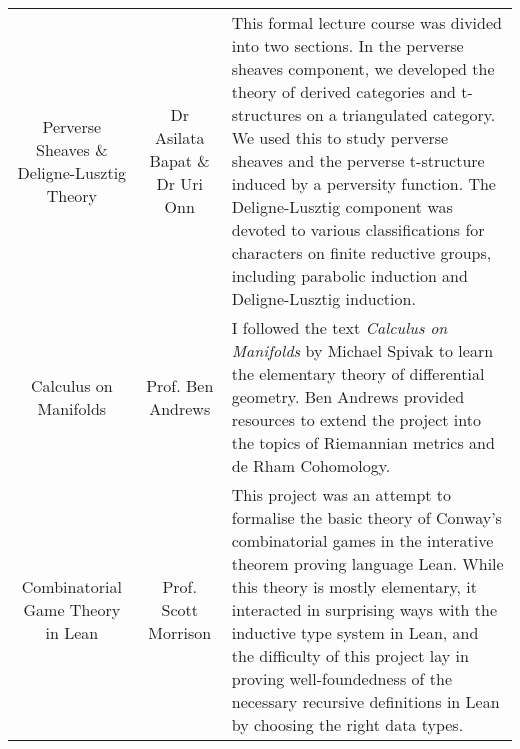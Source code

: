 \documentclass[a4paper,10pt]{article} %
\begin{document}
\begin{tabulary}{\textwidth}{ C  C  L }
Perverse Sheaves \& Deligne-Lusztig Theory & Dr Asilata Bapat \& Dr Uri Onn & \footnotesize This formal lecture course was divided into two sections. In the perverse sheaves component, we developed the theory of derived categories and t-structures on a triangulated category. We used this to study perverse sheaves and the perverse t-structure induced by a perversity function. The Deligne-Lusztig component was devoted to various classifications for characters on finite reductive groups, including parabolic induction and Deligne-Lusztig induction. \normalsize\\

Calculus on Manifolds & Prof. Ben Andrews & \footnotesize I followed the text \emph{Calculus on Manifolds} by Michael Spivak to learn the elementary theory of differential geometry. Ben Andrews provided resources to extend the project into the topics of Riemannian metrics and de Rham Cohomology.\normalsize\\

Combinatorial Game Theory in Lean & Prof. Scott Morrison & \footnotesize This project was an attempt to formalise the basic theory of Conway's combinatorial games in the interative theorem proving language Lean. While this theory is mostly elementary, it interacted in surprising ways with the inductive type system in Lean, and the difficulty of this project lay in proving well-foundedness of the necessary recursive definitions in Lean by choosing the right data types.\normalsize\\
\end{tabulary}
\egroup
\end{document}
